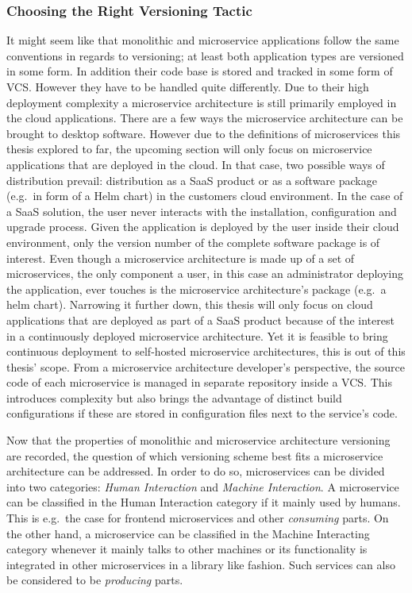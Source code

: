 \subsubsection{Choosing the Right Versioning Tactic}%
\label{ssub:Choosing_the_Right_Versioning_Tactic}

It might seem like that monolithic and microservice applications
follow the same conventions in regards to versioning; at least both application
types are versioned in some form. In addition their code base is stored and
tracked in some form of \ac{VCS}. However they have to be handled quite
differently. Due to their high deployment complexity a microservice
architecture is still primarily employed in the cloud applications. There are a
few ways the microservice architecture can be brought to desktop software.
However due to the definitions of microservices this thesis explored to far,
the upcoming section will only focus on microservice applications that are
deployed in the cloud. In that case, two possible ways of distribution prevail:
distribution as a \ac{SaaS} product or as a software package (e.g.\ in form of
a Helm chart) in the customers cloud environment. In the case of a \ac{SaaS}
solution, the user never interacts with the installation, configuration and
upgrade process. Given the application is deployed by the user inside their
cloud environment, only the version number of the complete software package is
of interest. Even though a microservice architecture is made up of a set of
microservices, the only component a user, in this case an administrator
deploying the application, ever touches is the microservice architecture's
package (e.g.\ a helm chart). Narrowing it further down, this thesis will only
focus on cloud applications that are deployed as part of a \ac{SaaS} product
because of the interest in a continuously deployed microservice architecture.
Yet it is feasible to bring continuous deployment to self-hosted microservice
architectures, this is out of this thesis' scope. From a microservice
architecture developer's perspective, the source code of each microservice is
managed in separate repository inside a \ac{VCS}. This introduces complexity
but also brings the advantage of distinct build configurations if these are
stored in configuration files next to the service's code.

Now that the properties of monolithic and microservice architecture versioning
are recorded, the question of which versioning scheme best fits a microservice
architecture can be addressed. In order to do so, microservices can be divided
into two categories: \textit{Human Interaction} and \textit{Machine
Interaction}. A microservice can be classified in the Human Interaction
category if it mainly used by humans. This is e.g.\ the case for frontend
microservices and other \textit{consuming} parts. On the other hand, a
microservice can be classified in the Machine Interacting category whenever it
mainly talks to other machines or its functionality is integrated in other
microservices in a library like fashion. Such services can also be considered
to be \textit{producing} parts.

